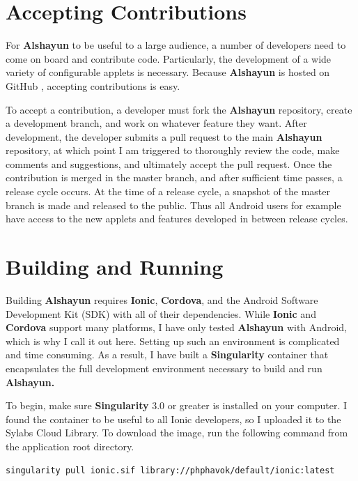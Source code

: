 \documentclass[12pt]{report}
\begin{document}
    \section{Accepting Contributions}

For \textbf{Alshayun} to be useful to a large audience, a number of developers
need to come on board and contribute code. Particularly, the development of a
wide variety of configurable applets is necessary. Because \textbf{Alshayun} is
hosted on GitHub \cite{github}, accepting contributions is easy.

To accept a contribution, a developer must fork the \textbf{Alshayun}
repository, create a development branch, and work on whatever feature they want.
After development, the developer submits a pull request to the main
\textbf{Alshayun} repository, at which point I am triggered to thoroughly review
the code, make comments and suggestions, and ultimately accept the pull request.
Once the contribution is merged in the master branch, and after sufficient time
passes, a release cycle occurs. At the time of a release cycle, a snapshot of
the master branch is made and released to the public.  Thus all Android users
for example have access to the new applets and features developed in between
release cycles.

    \section{Building and Running}

Building \textbf{Alshayun} requires \textbf{Ionic}, \textbf{Cordova}, and the
Android Software Development Kit (SDK) with all of their dependencies. While
\textbf{Ionic} and \textbf{Cordova} support many platforms, I have only tested
\textbf{Alshayun} with Android, which is why I call it out here. Setting up such
an environment is complicated and time consuming. As a result, I have built a
\textbf{Singularity} container that encapsulates the full development
environment necessary to build and run \textbf{Alshayun.}

To begin, make sure \textbf{Singularity} 3.0 \cite{singularity3inst} or greater
is installed on your computer. I found the container to be useful to all Ionic
developers, so I uploaded it to the Sylabs Cloud Library. To download the image,
run the following command from the application root directory.

\begin{verbatim}
singularity pull ionic.sif library://phphavok/default/ionic:latest
\end{verbatim}
\end{document}
